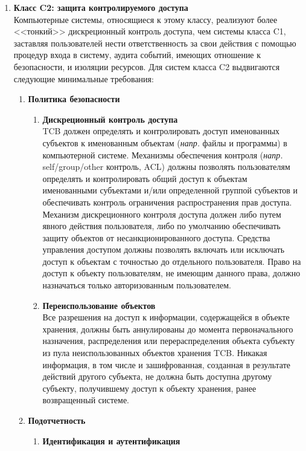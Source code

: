 \begin{enumerate}
\begin{enumerate}
\begin{enumerate}
		\end{enumerate}
		\item{\textbf{Класс C2: защита контролируемого доступа}}\\
		Компьютерные системы, относящиеся к этому классу, реализуют более <<тонкий>> дискреционный контроль доступа, чем системы класса C1, заставляя пользователей нести ответственность за свои
		действия с помощью процедур входа в систему, аудита событий, имеющих отношение к безопасности, и изоляции ресурсов. Для систем класса C2 выдвигаются следующие минимальные требования:
		\begin{enumerate}
			\item{\textbf{Политика безопасности}}
			\begin{enumerate}
				\item{\textbf{Дискреционный контроль доступа}}\\
				TCB должен определять и контролировать доступ именованных субъектов к именованным объектам (\textit{напр.} файлы и программы) в компьютерной системе. Механизмы обеспечения контроля
				(\textit{напр.} self/group/other контроль, ACL) должны позволять пользователям определять и контролировать общий доступ к объектам именованными субъектами и/или определенной группой
				субъектов и обеспечивать контроль ограничения распространения прав доступа. Механизм дискреционного контроля доступа должен либо путем явного действия пользователя, либо по умолчанию
				обеспечивать защиту объектов от несанкционированного доступа. Средства управления доступом должны позволять включать или исключать доступ к объектам с точностью до отдельного
				пользователя. Право на доступ к объекту пользователям, не имеющим данного права, должно назначаться только авторизованным пользователем.
				\item{\textbf{Переиспользование объектов}}\\
				Все разрешения на доступ к информации, содержащейся в объекте хранения, должны быть аннулированы до момента первоначального назначения, распределения или перераспределения объекта
				субъекту из пула неиспользованных объектов хранения TCB. Никакая информация, в том числе и зашифрованная, созданная в результате действий другого субъекта, не должна быть доступна
				другому субъекту, получившему доступ к объекту хранения, ранее возвращенный системе.
			\end{enumerate}
			\item{\textbf{Подотчетность}}
			\begin{enumerate}
				\item{\textbf{Идентификация и аутентификация}}\\

\end{enumerate}
\end{enumerate}
\end{enumerate}
\end{enumerate}
